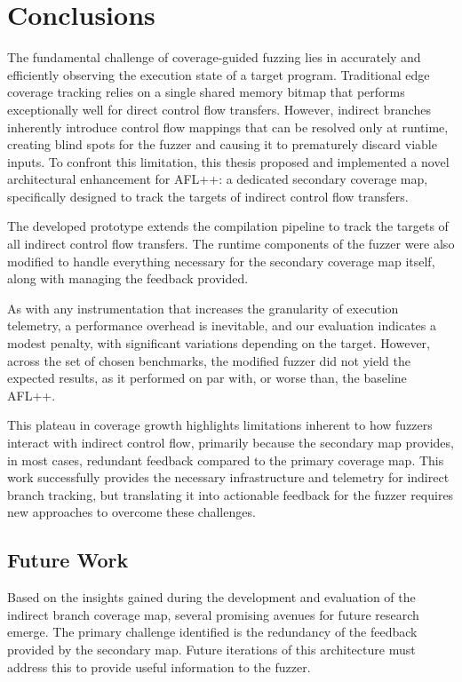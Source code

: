 \chapter{Conclusions}
\label{ch:concl}

The fundamental challenge of coverage-guided fuzzing lies in accurately and efficiently observing the execution state of a target program. Traditional edge coverage tracking relies on a single shared memory bitmap that performs exceptionally well for direct control flow transfers. However, indirect branches inherently introduce control flow mappings that can be resolved only at runtime, creating blind spots for the fuzzer and causing it to prematurely discard viable inputs. To confront this limitation, this thesis proposed and implemented a novel architectural enhancement for AFL++: a dedicated secondary coverage map, specifically designed to track the targets of indirect control flow transfers. 

The developed prototype extends the compilation pipeline to track the targets of all indirect control flow transfers. The runtime components of the fuzzer were also modified to handle everything necessary for the secondary coverage map itself, along with managing the feedback provided.

As with any instrumentation that increases the granularity of execution telemetry, a performance overhead is inevitable, and our evaluation indicates a modest penalty, with significant variations depending on the target. However, across the set of chosen benchmarks, the modified fuzzer did not yield the expected results, as it performed on par with, or worse than, the baseline AFL++. 

This plateau in coverage growth highlights limitations inherent to how fuzzers interact with indirect control flow, primarily because the secondary map provides, in most cases, redundant feedback compared to the primary coverage map. This work successfully provides the necessary infrastructure and telemetry for indirect branch tracking, but translating it into actionable feedback for the fuzzer requires new approaches to overcome these challenges.

\section{Future Work}

Based on the insights gained during the development and evaluation of the indirect branch coverage map, several promising avenues for future research emerge. The primary challenge identified is the redundancy of the feedback provided by the secondary map. Future iterations of this architecture must address this to provide useful information to the fuzzer.

